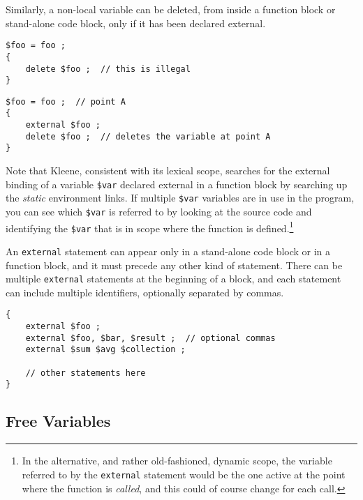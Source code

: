 \noindent
Similarly, a non-local variable can be deleted, from inside a
function block or stand-alone code block, only if it has been
declared external.

\begin{samepage}
\begin{Verbatim}
$foo = foo ;
{
    delete $foo ;  // this is illegal
}
\end{Verbatim}
\end{samepage}

\begin{samepage}
\begin{Verbatim}
$foo = foo ;  // point A
{
    external $foo ;
    delete $foo ;  // deletes the variable at point A
}
\end{Verbatim}
\end{samepage}

Note that Kleene, consistent with its lexical scope, searches for
the external binding of a variable \verb!$var! declared external in
a function block by
searching up the \emph{static} environment links.  If multiple
\verb!$var! variables are in use in the program, you can see
which \verb!$var! is referred to by
looking at the source code and identifying the \verb!$var! that
is in scope where the function is defined.\footnote{In the
alternative, and rather old-fashioned, dynamic scope, the variable
referred to by the \texttt{external} statement would be the one
active at the point where the function is \emph{called}, and this
could of course change for each call.}

An \texttt{external} statement can appear only in a stand-alone code block or in a
function block, and it must precede any other kind of statement.  There can be multiple
\texttt{external} statements at the beginning of a block, 
and each statement can include multiple
identifiers, optionally separated by commas.

\begin{samepage}
\begin{Verbatim}
{
    external $foo ;
    external $foo, $bar, $result ;  // optional commas
    external $sum $avg $collection ;

    // other statements here
}
\end{Verbatim}
\end{samepage}


\subsection{Free Variables}

